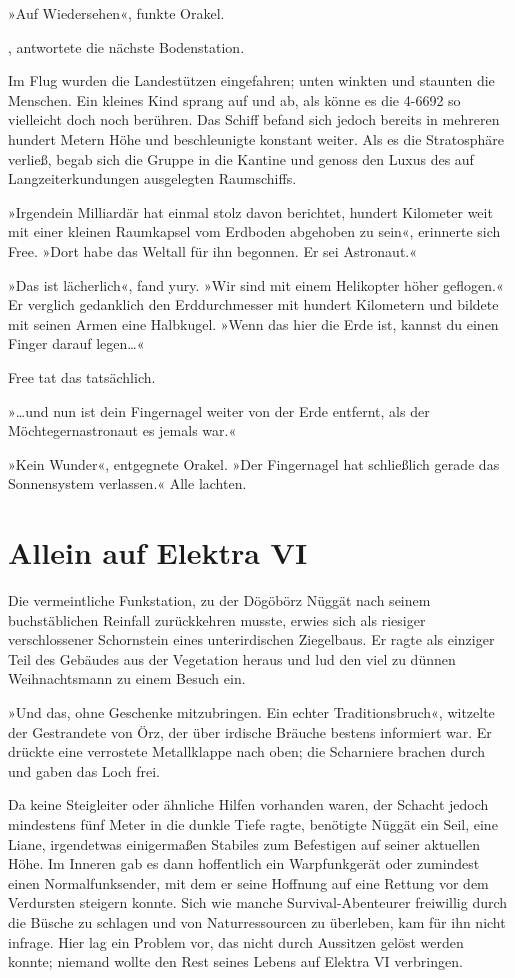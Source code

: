 »Auf Wiedersehen«, funkte Orakel.

, antwortete die nächste Bodenstation.

Im Flug wurden die Landestützen eingefahren; unten winkten und staunten die Menschen. Ein kleines Kind sprang auf und ab, als könne es die 4-6692 so vielleicht doch noch berühren. Das Schiff befand sich jedoch bereits in mehreren hundert Metern Höhe und beschleunigte konstant weiter. Als es die Stratosphäre verließ, begab sich die Gruppe in die Kantine und genoss den Luxus des auf Langzeiterkundungen ausgelegten Raumschiffs.

»Irgendein Milliardär hat einmal stolz davon berichtet, hundert Kilometer weit mit einer kleinen Raumkapsel vom Erdboden abgehoben zu sein«, erinnerte sich Free. »Dort habe das Weltall für ihn begonnen. Er sei Astronaut.«

»Das ist lächerlich«, fand yury. »Wir sind mit einem Helikopter höher geflogen.« Er verglich gedanklich den Erddurchmesser mit hundert Kilometern und bildete mit seinen Armen eine Halbkugel. »Wenn das hier die Erde ist, kannst du einen Finger darauf legen…«

Free tat das tatsächlich.

»…und nun ist dein Fingernagel weiter von der Erde entfernt, als der Möchtegernastronaut es jemals war.«

»Kein Wunder«, entgegnete Orakel. »Der Fingernagel hat schließlich gerade das Sonnensystem verlassen.« Alle lachten.


\chapter{Allein auf Elektra VI}

Die vermeintliche Funkstation, zu der Dögöbörz Nüggät nach seinem buchstäblichen Reinfall zurückkehren musste, erwies sich als riesiger verschlossener Schornstein eines unterirdischen Ziegelbaus. Er ragte als einziger Teil des Gebäudes aus der Vegetation heraus und lud den viel zu dünnen Weihnachtsmann zu einem Besuch ein.

»Und das, ohne Geschenke mitzubringen. Ein echter Traditionsbruch«, witzelte der Gestrandete von Örz, der über irdische Bräuche bestens informiert war. Er drückte eine verrostete Metallklappe nach oben; die Scharniere brachen durch und gaben das Loch frei.

Da keine Steigleiter oder ähnliche Hilfen vorhanden waren, der Schacht jedoch mindestens fünf Meter in die dunkle Tiefe ragte, benötigte Nüggät ein Seil, eine Liane, irgendetwas einigermaßen Stabiles zum Befestigen auf seiner aktuellen Höhe. Im Inneren gab es dann hoffentlich ein Warpfunkgerät oder zumindest einen Normalfunksender, mit dem er seine Hoffnung auf eine Rettung vor dem Verdursten steigern konnte. Sich wie manche Survival-Abenteurer freiwillig durch die Büsche zu schlagen und von Naturressourcen zu überleben, kam für ihn nicht infrage. Hier lag ein Problem vor, das nicht durch Aussitzen gelöst werden konnte; niemand wollte den Rest seines Lebens auf Elektra VI verbringen.

